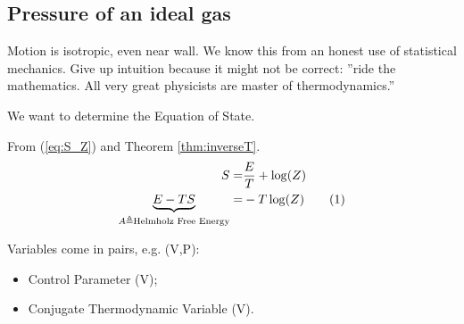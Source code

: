 \documentclass[]{article}
\newcommand\numberthis{\addtocounter{equation}{1}\tag{\theequation}}
\begin{document}
\subsection{Pressure of an ideal gas}

Motion is isotropic, even near wall. We know this from an honest use of statistical mechanics. Give up intuition because it might not be correct: ''ride the mathematics. All very great physicists are master of thermodynamics.''

We want to determine the Equation of State.

From (\ref{eq:S_Z}) and Theorem \ref{thm:inverseT}.
\begin{align*}
S =& \frac{E}{T} + \log(Z)\\
\underbrace{E - TS}_{A\triangleq\text{Helmholz Free Energy}} =& -T \log(Z) \numberthis \label{eq:helmholz}
\end{align*}

Variables come in pairs, e.g. (V,P):
\begin{itemize}
	\item Control Parameter (V);
	\item Conjugate Thermodynamic Variable (V).
\end{itemize}
\end{document}
